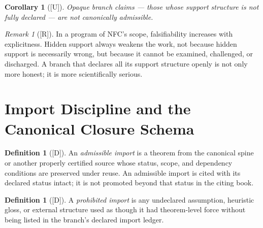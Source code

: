\documentclass[12pt,oneside]{amsbook}
\theoremstyle{plain}
\newtheorem{corollary}[theorem]{Corollary}
\theoremstyle{definition}
\newtheorem{definition}[theorem]{Definition}
\theoremstyle{remark}
\newtheorem{remark}[theorem]{Remark}
\newcommand{\status}[1]{\textup{[#1]}}
\begin{document}
\begin{corollary}[\status{U}]\label{cor:opaque-inadmissible}
Opaque branch claims --- those whose support structure is not fully
declared --- are not canonically admissible.
\end{corollary}

\begin{remark}[\status{R}]\label{rmk:falsifiability-honesty}
In a program of NFC's scope, falsifiability increases with
explicitness.  Hidden support always weakens the work, not because
hidden support is necessarily wrong, but because it cannot be examined,
challenged, or discharged.  A branch that declares all its support
structure openly is not only more honest; it is more scientifically
serious.
\end{remark}

\section{Import Discipline and the Canonical Closure Schema}

\begin{definition}[\status{D}]\label{def:admissible-import}
An \emph{admissible import} is a theorem from the canonical spine or
another properly certified source whose status, scope, and dependency
conditions are preserved under reuse.  An admissible import is cited
with its declared status intact; it is not promoted beyond that status
in the citing book.
\end{definition}

\begin{definition}[\status{D}]\label{def:prohibited-import}
A \emph{prohibited import} is any undeclared assumption, heuristic
gloss, or external structure used as though it had theorem-level force
without being listed in the branch's declared import ledger.
\end{definition}
\end{document}
